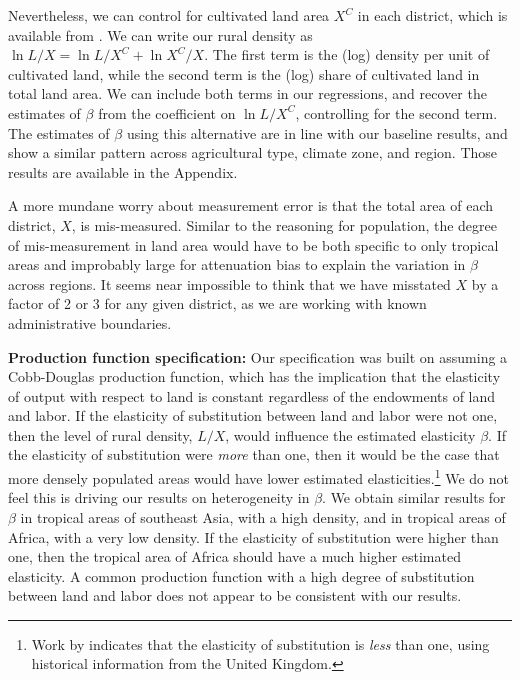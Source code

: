\documentclass[11pt]{article}
\begin{document}
Nevertheless, we can control for cultivated land area $X^C$ in each district, which is available from \cite{gaez}. We can write our rural density as $\ln L/X = \ln L/X^C + \ln X^C/X$. The first term is the (log) density per unit of cultivated land, while the second term is the (log) share of cultivated land in total land area. We can include both terms in our regressions, and recover the estimates of $\beta$ from the coefficient on $\ln L/X^C$, controlling for the second term. The estimates of $\beta$ using this alternative are in line with our baseline results, and show a similar pattern across agricultural type, climate zone, and region. Those results are available in the Appendix.

A more mundane worry about measurement error is that the total area of each district, $X$, is mis-measured. Similar to the reasoning for population, the degree of mis-measurement in land area would have to be both specific to only tropical areas and improbably large for attenuation bias to explain the variation in $\beta$ across regions. It seems near impossible to think that we have misstated $X$ by a factor of 2 or 3 for any given district, as we are working with known administrative boundaries.

\vspace{.5cm}\noindent\textbf{Production function specification:} Our specification was built on assuming a Cobb-Douglas production function, which has the implication that the elasticity of output with respect to land is constant regardless of the endowments of land and labor. If the elasticity of substitution between land and labor were not one, then the level of rural density, $L/X$, would influence the estimated elasticity $\beta$. If the elasticity of substitution were \textit{more} than one, then it would be the case that more densely populated areas would have lower estimated elasticities.\footnote{Work by \citet{wilde2012} indicates that the elasticity of substitution is \textit{less} than one, using historical information from the United Kingdom.} We do not feel this is driving our results on heterogeneity in $\beta$. We obtain similar results for $\beta$ in tropical areas of southeast Asia, with a high density, and in tropical areas of Africa, with a very low density. If the elasticity of substitution were higher than one, then the tropical area of Africa should have a much higher estimated elasticity. A common production function with a high degree of substitution between land and labor does not appear to be consistent with our results.
\end{document}
